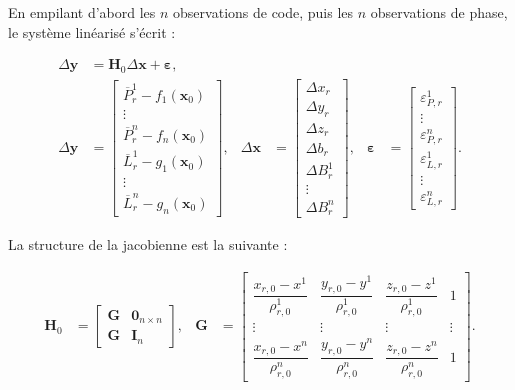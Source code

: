 En empilant d'abord les $n$ observations de code, puis les $n$ observations de
phase, le système linéarisé s'écrit :

\begin{align}
\Delta\mathbf y
&=
\mathbf H_0\Delta\mathbf x+\boldsymbol\varepsilon,
\label{eq:stacked_linearized_system}
\\
\Delta\mathbf y
&=
\begin{bmatrix}
\overline P_r^1-f_1(\mathbf x_0)\\
\vdots\\
\overline P_r^n-f_n(\mathbf x_0)\\
\overline L_r^1-g_1(\mathbf x_0)\\
\vdots\\
\overline L_r^n-g_n(\mathbf x_0)
\end{bmatrix},
&
\Delta\mathbf x
&=
\begin{bmatrix}
\Delta x_r\\
\Delta y_r\\
\Delta z_r\\
\Delta b_r\\
\Delta B_r^1\\
\vdots\\
\Delta B_r^n
\end{bmatrix},
&
\boldsymbol\varepsilon
&=
\begin{bmatrix}
\varepsilon_{P,r}^1\\
\vdots\\
\varepsilon_{P,r}^n\\
\varepsilon_{L,r}^1\\
\vdots\\
\varepsilon_{L,r}^n
\end{bmatrix}.
\label{eq:stacked_vectors}
\end{align}


La structure de la jacobienne est la suivante :

\begin{align}
\mathbf H_0
&=
\begin{bmatrix}
\mathbf G & \mathbf 0_{n\times n}\\
\mathbf G & \mathbf I_n
\end{bmatrix},
&
\mathbf G
&=
\begin{bmatrix}
\dfrac{x_{r,0}-x^1}{\rho_{r,0}^1} &
\dfrac{y_{r,0}-y^1}{\rho_{r,0}^1} &
\dfrac{z_{r,0}-z^1}{\rho_{r,0}^1} & 1\\
\vdots & \vdots & \vdots & \vdots\\
\dfrac{x_{r,0}-x^n}{\rho_{r,0}^n} &
\dfrac{y_{r,0}-y^n}{\rho_{r,0}^n} &
\dfrac{z_{r,0}-z^n}{\rho_{r,0}^n} & 1
\end{bmatrix}.
\label{eq:gnss_design_matrix}
\end{align}

